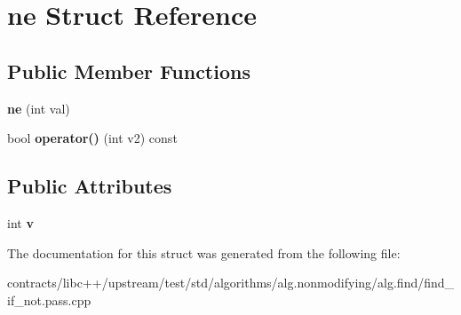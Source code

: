 \hypertarget{structne}{}\section{ne Struct Reference}
\label{structne}
\subsection*{Public Member Functions}
\begin{DoxyCompactItemize}
\item 
\mbox{\label{structne_a994698733fdea89c33d0e30e3f146e74}} 
{\bfseries ne} (int val)
\item 
\mbox{\label{structne_ac48edf92e7d146b12766de356886d19a}} 
bool {\bfseries operator()} (int v2) const
\end{DoxyCompactItemize}
\subsection*{Public Attributes}
\begin{DoxyCompactItemize}
\item 
\mbox{\label{structne_a423d783028a358adcdc628b506f5118b}} 
int {\bfseries v}
\end{DoxyCompactItemize}


The documentation for this struct was generated from the following file\+:\begin{DoxyCompactItemize}
\item 
contracts/libc++/upstream/test/std/algorithms/alg.\+nonmodifying/alg.\+find/find\+\_\+if\+\_\+not.\+pass.\+cpp\end{DoxyCompactItemize}
